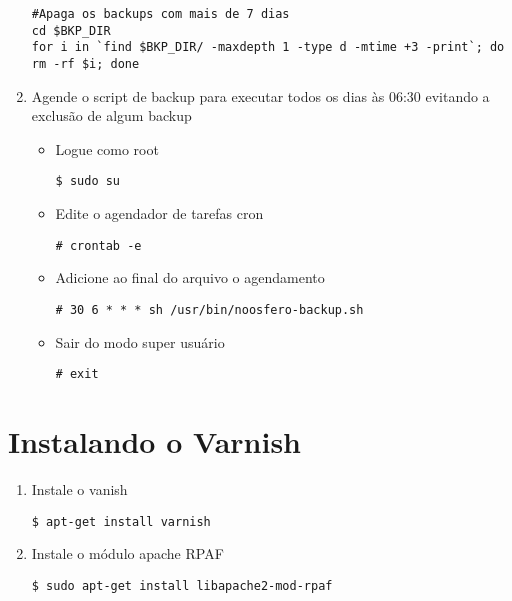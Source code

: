 \begin{enumerate}[label=\alph*)]
\begin{lstlisting}
#Apaga os backups com mais de 7 dias
cd $BKP_DIR
for i in `find $BKP_DIR/ -maxdepth 1 -type d -mtime +3 -print`; do rm -rf $i; done
\end{lstlisting}
\item Agende o script de backup para executar todos os dias às 06:30 evitando a exclusão de algum backup

\begin{itemize}

\item Logue como root
\begin{lstlisting}
$ sudo su
\end{lstlisting}

\item Edite o agendador de tarefas cron
\begin{lstlisting}
# crontab -e
\end{lstlisting}

\item Adicione ao final do arquivo o agendamento
\begin{lstlisting}
# 30 6 * * * sh /usr/bin/noosfero-backup.sh
\end{lstlisting}

\item Sair do modo super usuário
\begin{lstlisting}
# exit
\end{lstlisting}
\end{itemize}
\end{enumerate}

\section{Instalando o Varnish}

\begin{enumerate}[label=\alph*)]
\item Instale o vanish
\begin{lstlisting}
$ apt-get install varnish
\end{lstlisting}

\item Instale o módulo apache RPAF
\begin{lstlisting}
$ sudo apt-get install libapache2-mod-rpaf
\end{lstlisting}
\end{enumerate}

